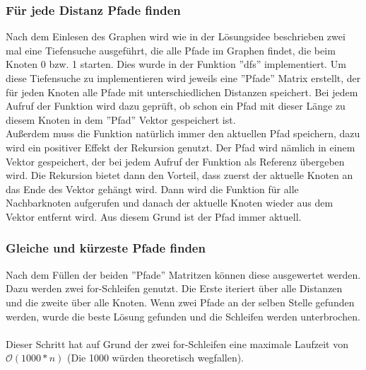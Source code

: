 \documentclass[a4paper,10pt,ngerman]{scrartcl}
\begin{document}
      \subsubsection{Für jede Distanz Pfade finden}
        Nach dem Einlesen des Graphen wird wie in der Lösungsidee beschrieben zwei mal eine Tiefensuche ausgeführt, die alle Pfade im Graphen findet, die beim Knoten 0 bzw. 1 starten. Dies wurde in der Funktion ''dfs'' implementiert. Um diese Tiefensuche zu implementieren wird jeweils eine ''Pfade'' Matrix erstellt, der für jeden Knoten alle Pfade mit unterschiedlichen Distanzen speichert. Bei jedem Aufruf der Funktion wird dazu geprüft, ob schon ein Pfad mit dieser Länge zu diesem Knoten in dem ''Pfad'' Vektor gespeichert ist.\\
        Außerdem muss die Funktion natürlich immer den aktuellen Pfad speichern, dazu wird ein positiver Effekt der Rekursion genutzt. Der Pfad wird nämlich in einem Vektor gespeichert, der bei jedem Aufruf der Funktion als Referenz übergeben wird. Die Rekursion bietet dann den Vorteil, dass zuerst der aktuelle Knoten an das Ende des Vektor gehängt wird. Dann wird die Funktion für alle Nachbarknoten aufgerufen und danach der aktuelle Knoten wieder aus dem Vektor entfernt wird. Aus diesem Grund ist der Pfad immer aktuell.
      \subsubsection{Gleiche und kürzeste Pfade finden}
        Nach dem Füllen der beiden ''Pfade'' Matritzen können diese ausgewertet werden. Dazu werden zwei for-Schleifen genutzt. Die Erste iteriert über alle Distanzen und die zweite über alle Knoten. Wenn zwei Pfade an der selben Stelle gefunden werden, wurde die beste Lösung gefunden und die Schleifen werden unterbrochen.\\\\
        Dieser Schritt hat auf Grund der zwei for-Schleifen eine maximale Laufzeit von $\mathcal{O}(1000 * n)$ (Die 1000 würden theoretisch wegfallen).
\end{document}
